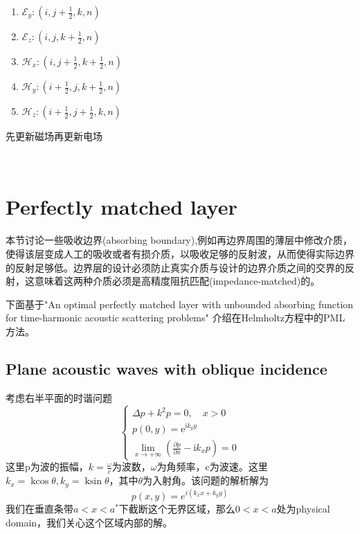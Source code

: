 \documentclass{article}
\newcommand{\tmop}[1]{\ensuremath{\operatorname{#1}}}
\begin{document}
\begin{CJK*}{UTF8}{gbsn}
\begin{enumerate}
  \item $\mathscr{E}_y : \left( i, j + \frac{1}{2}, k, n \right)$
  
  \item $\mathscr{E}_z : \left( i, j, k + \frac{1}{2}, n \right)$
  
  \item $\mathscr{H}_x : \left( i, j + \frac{1}{2}, k + \frac{1}{2}, n
  \right)$
  
  \item $\mathscr{H}_y : \left( i + \frac{1}{2}, j, k + \frac{1}{2}, n
  \right)$
  
  \item $\mathscr{H}_z : \left( i + \frac{1}{2}, j + \frac{1}{2}, k, n
  \right)$
\end{enumerate}
先更新磁场再更新电场

\

\section{Perfectly matched layer}

本节讨论一些吸收边界(absorbing
boundary),例如再边界周围的薄层中修改介质，使得该层变成人工的吸收或者有损介质，以吸收足够的反射波，从而使得实际边界的反射足够低。边界层的设计必须防止真实介质与设计的边界介质之间的交界的反射，这意味着这两种介质必须是高精度阻抗匹配(impedance-matched)的。

下面基于"An optimal perfectly matched layer with unbounded absorbing
function for time-harmonic acoustic scattering problems"
介绍在Helmholtz方程中的PML方法。

\subsection{Plane acoustic waves with oblique incidence}

考虑右半平面的时谐问题
\[ \left\{ \begin{array}{l}
     \Delta p + k^2 p = 0, \quad x > 0\\
     p (0, y) = \mathrm{e}^{\mathrm{i} k_y y}\\
     \lim_{x \rightarrow + \infty} \left( \frac{\partial p}{\partial x} -
     \mathrm{i} k_x p \right) = 0
   \end{array} \right. \]
这里p为波的振幅，$k =
\frac{\omega}{c}$为波数，$\omega$为角频率，c为波速。这里$k_x =
\tmop{kcos} \theta, k_y = \tmop{ksin}
\theta$，其中$\theta$为入射角。该问题的解析解为
\[ p (x, y) = e^{i (k_x x + k_y y)} \]
我们在垂直条带$a < x < a^{\ast}$下截断这个无界区域，那么$0
< x < a$处为physical domain，我们关心这个区域内部的解。


\end{CJK*}
\end{document}
